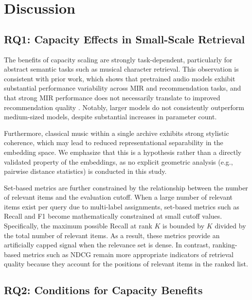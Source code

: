 \documentclass{article}
\begin{document}
\section{Discussion}

\subsection{RQ1: Capacity Effects in Small-Scale Retrieval}

The benefits of capacity scaling are strongly task-dependent, particularly for abstract semantic tasks such as musical character retrieval. This observation is consistent with prior work, which shows that pretrained audio models exhibit substantial performance variability across MIR and recommendation tasks, and that strong MIR performance does not necessarily translate to improved recommendation quality \cite{tamm2024}. Notably, larger models do not consistently outperform medium-sized models, despite substantial increases in parameter count.

Furthermore, classical music within a single archive exhibits strong stylistic coherence, which may lead to reduced representational separability in the embedding space. We emphasize that this is a hypothesis rather than a directly validated property of the embeddings, as no explicit geometric analysis (e.g., pairwise distance statistics) is conducted in this study.

Set-based metrics are further constrained by the relationship between the number of relevant items and the evaluation cutoff. When a large number of relevant items exist per query due to multi-label assignments, set-based metrics such as Recall and F1 become mathematically constrained at small cutoff values. Specifically, the maximum possible Recall at rank $K$ is bounded by $K$ divided by the total number of relevant items. As a result, these metrics provide an artificially capped signal when the relevance set is dense. In contrast, ranking-based metrics such as NDCG remain more appropriate indicators of retrieval quality because they account for the positions of relevant items in the ranked list.

\subsection{RQ2: Conditions for Capacity Benefits}
\end{document}
